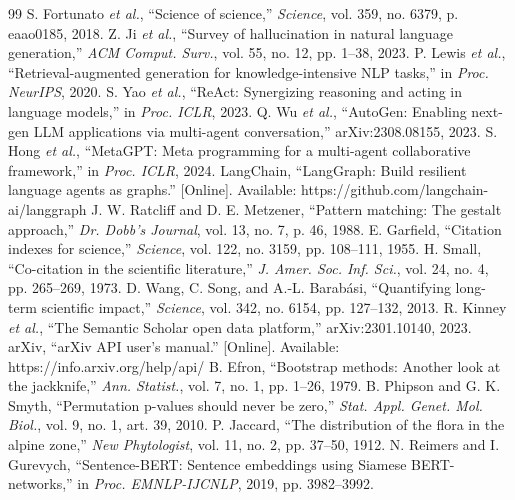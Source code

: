 \documentclass[conference]{IEEEtran}
\begin{document}
\balance
\begin{thebibliography}{99}
 S. Fortunato \emph{et al.}, ``Science of science,'' \emph{Science}, vol. 359, no. 6379, p. eaao0185, 2018.
 Z. Ji \emph{et al.}, ``Survey of hallucination in natural language generation,'' \emph{ACM Comput. Surv.}, vol. 55, no. 12, pp. 1--38, 2023.
 P. Lewis \emph{et al.}, ``Retrieval-augmented generation for knowledge-intensive {NLP} tasks,'' in \emph{Proc. NeurIPS}, 2020.
 S. Yao \emph{et al.}, ``{ReAct}: Synergizing reasoning and acting in language models,'' in \emph{Proc. ICLR}, 2023.
 Q. Wu \emph{et al.}, ``{AutoGen}: Enabling next-gen {LLM} applications via multi-agent conversation,'' arXiv:2308.08155, 2023.
 S. Hong \emph{et al.}, ``{MetaGPT}: Meta programming for a multi-agent collaborative framework,'' in \emph{Proc. ICLR}, 2024.
 LangChain, ``{LangGraph}: Build resilient language agents as graphs.'' [Online]. Available: https://github.com/langchain-ai/langgraph
 J. W. Ratcliff and D. E. Metzener, ``Pattern matching: The gestalt approach,'' \emph{Dr. Dobb's Journal}, vol. 13, no. 7, p. 46, 1988.
 E. Garfield, ``Citation indexes for science,'' \emph{Science}, vol. 122, no. 3159, pp. 108--111, 1955.
 H. Small, ``Co-citation in the scientific literature,'' \emph{J. Amer. Soc. Inf. Sci.}, vol. 24, no. 4, pp. 265--269, 1973.
 D. Wang, C. Song, and A.-L. Barab{\'a}si, ``Quantifying long-term scientific impact,'' \emph{Science}, vol. 342, no. 6154, pp. 127--132, 2013.
 R. Kinney \emph{et al.}, ``The {Semantic Scholar} open data platform,'' arXiv:2301.10140, 2023.
 arXiv, ``{arXiv API} user's manual.'' [Online]. Available: https://info.arxiv.org/help/api/
 B. Efron, ``Bootstrap methods: Another look at the jackknife,'' \emph{Ann. Statist.}, vol. 7, no. 1, pp. 1--26, 1979.
 B. Phipson and G. K. Smyth, ``Permutation p-values should never be zero,'' \emph{Stat. Appl. Genet. Mol. Biol.}, vol. 9, no. 1, art. 39, 2010.
 P. Jaccard, ``The distribution of the flora in the alpine zone,'' \emph{New Phytologist}, vol. 11, no. 2, pp. 37--50, 1912.
 N. Reimers and I. Gurevych, ``{Sentence-BERT}: Sentence embeddings using {Siamese BERT}-networks,'' in \emph{Proc. EMNLP-IJCNLP}, 2019, pp. 3982--3992.

\end{thebibliography}
\end{document}
